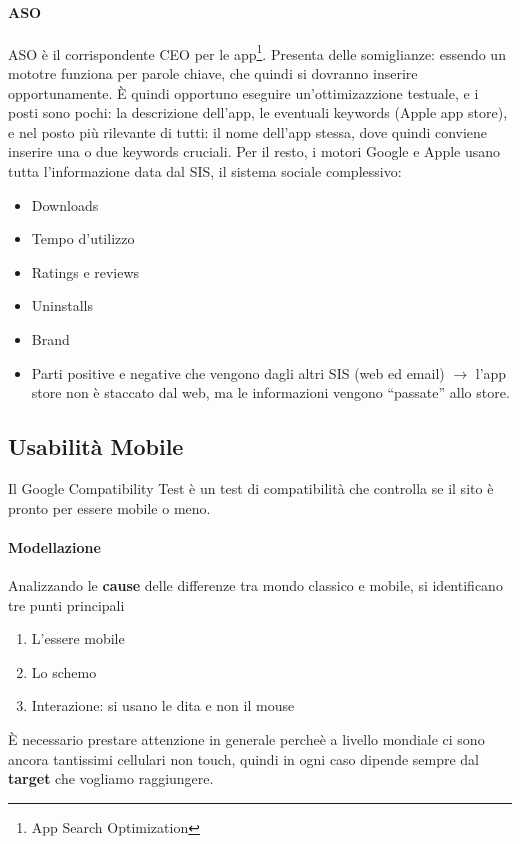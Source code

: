 \paragraph*{ASO}ASO \`e il corrispondente CEO per le app\footnote{App Search Optimization}. Presenta delle somiglianze: essendo un mototre funziona per parole chiave, che quindi si dovranno inserire opportunamente. \`E quindi opportuno eseguire un'ottimizazzione testuale, e i posti sono pochi: la descrizione dell'app, le eventuali keywords (Apple app store), e nel posto pi\`u rilevante di tutti: il nome dell'app stessa, dove quindi conviene inserire una o due keywords cruciali. Per il resto, i motori Google e Apple usano tutta l'informazione data dal SIS, il sistema sociale complessivo:
\begin{itemize}

\item Downloads
\item Tempo d'utilizzo
\item Ratings e reviews
\item Uninstalls
\item Brand
\item Parti positive e negative che vengono dagli altri SIS (web ed email) $\to$ l'app store non \`e staccato dal web, ma le informazioni vengono ``passate'' allo store.
  
\end{itemize}

\subsection{Usabilit\`a Mobile}

Il Google Compatibility Test \`e un test di compatibilit\`a che controlla se il sito \`e pronto per essere mobile o meno.

\paragraph*{Modellazione}Analizzando le \textbf{cause} delle differenze tra mondo classico e mobile, si identificano tre punti principali
\begin{enumerate}
  
\item L'essere mobile
\item Lo schemo
\item Interazione: si usano le dita e non il mouse
  
\end{enumerate}
\`E necessario prestare attenzione in generale perche\`e a livello mondiale ci sono ancora tantissimi cellulari non touch, quindi in ogni caso dipende sempre dal \textbf{target} che vogliamo raggiungere.


